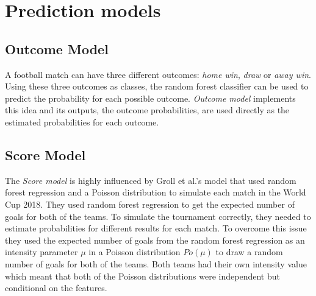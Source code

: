 \section{Prediction models}
\subsection{Outcome Model}
A football match can have three different outcomes: \textit{home win}, \textit{draw} or \textit{away win}. Using these three outcomes as classes, the random forest classifier can be used to predict the probability for each possible outcome. \textit{Outcome model} implements this idea and its outputs, the outcome probabilities, are used directly as the estimated probabilities for each outcome.
\subsection{Score Model}
The \textit{Score model} is highly influenced by Groll et al.'s \cite{groll2018prediction} model that used random forest regression and a Poisson distribution to simulate each match in the World Cup 2018. They used random forest regression to get the expected number of goals for both of the teams. To simulate the tournament correctly, they needed to estimate probabilities for different results for each match. To overcome this issue they used the expected number of goals from the random forest regression as an intensity parameter $\mu$ in a Poisson distribution $Po(\mu)$ to draw a random number of goals for both of the teams. Both teams had their own intensity value which meant that both of the Poisson distributions were independent but conditional on the features.

